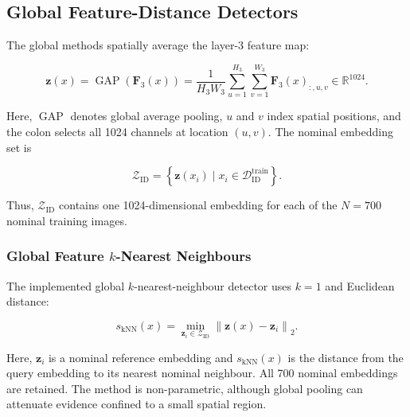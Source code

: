 \documentclass[fleqn,12pt]{olplainarticle}
\begin{document}
\subsection{Global Feature-Distance Detectors}
\label{subsec:global_feature_methods}

The global methods spatially average the layer-3 feature map:

\begin{equation}
    \mathbf{z}(x)
    =
    \operatorname{GAP}\!\left(\mathbf{F}_{3}(x)\right)
    =
    \frac{1}{H_3W_3}
    \sum_{u=1}^{H_3}
    \sum_{v=1}^{W_3}
    \mathbf{F}_{3}(x)_{:,u,v}
    \in\mathbb{R}^{1024}.
    \label{eq:method_global_pooling}
\end{equation}

Here, $\operatorname{GAP}$ denotes global average pooling, $u$ and $v$ index
spatial positions, and the colon selects all 1024 channels at location
$(u,v)$. The nominal embedding set is

\begin{equation}
    \mathcal{Z}_{\mathrm{ID}}
    =
    \left\{
        \mathbf{z}(x_i)
        \mid
        x_i\in\mathcal{D}_{\mathrm{ID}}^{\mathrm{train}}
    \right\}.
    \label{eq:method_id_embedding_set}
\end{equation}

Thus, $\mathcal{Z}_{\mathrm{ID}}$ contains one 1024-dimensional embedding for
each of the $N=700$ nominal training images.

\subsubsection{Global Feature $k$-Nearest Neighbours}
\label{subsubsec:global_knn}

The implemented global $k$-nearest-neighbour detector uses $k=1$ and
Euclidean distance:

\begin{equation}
    s_{\mathrm{kNN}}(x)
    =
    \min_{\mathbf{z}_i\in\mathcal{Z}_{\mathrm{ID}}}
    \left\|
        \mathbf{z}(x)-\mathbf{z}_i
    \right\|_2.
    \label{eq:method_global_knn_score}
\end{equation}

Here, $\mathbf{z}_i$ is a nominal reference embedding and
$s_{\mathrm{kNN}}(x)$ is the distance from the query embedding to its nearest
nominal neighbour. All 700 nominal embeddings are retained. The method is
non-parametric, although global pooling can attenuate evidence confined to a
small spatial region.
\end{document}
